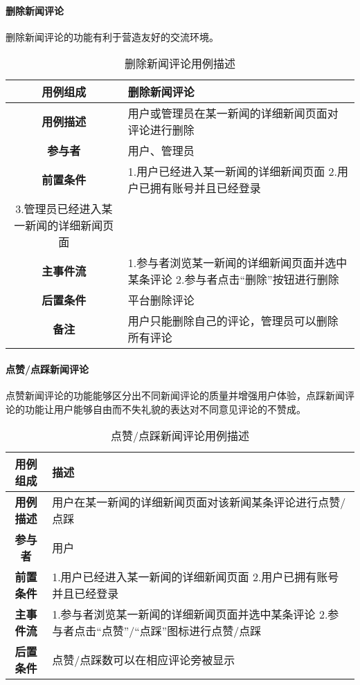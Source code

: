 \paragraph{删除新闻评论}

删除新闻评论的功能有利于营造友好的交流环境。\\

\begin{table}[H]
	\centering
	\caption{删除新闻评论用例描述}
	\renewcommand\arraystretch{1.5}
	\begin{tabular}{|c|>{\raggedright\arraybackslash}p{10cm}|}
		\hline
		\textbf{用例组成} & \textbf{删除新闻评论}\\
		\hline
		\textbf{用例描述} & 用户或管理员在某一新闻的详细新闻页面对评论进行删除\\
		\hline
		\textbf{参与者} & 用户、管理员\\
		\hline
		\textbf{前置条件} &
		1.用户已经进入某一新闻的详细新闻页面\newline
		2.用户已拥有账号并且已经登录\\
		3.管理员已经进入某一新闻的详细新闻页面\\
		\hline
		\textbf{主事件流} &
		1.参与者浏览某一新闻的详细新闻页面并选中某条评论\newline
		2.参与者点击“删除”按钮进行删除\\
		\hline
		\textbf{后置条件} & 平台删除评论\\
		\hline
		\textbf{备注} & 用户只能删除自己的评论，管理员可以删除所有评论\\
		\hline
	\end{tabular}
\end{table}

\paragraph{点赞/点踩新闻评论}

点赞新闻评论的功能能够区分出不同新闻评论的质量并增强用户体验，点踩新闻评论的功能让用户能够自由而不失礼貌的表达对不同意见评论的不赞成。\\

\begin{table}[H]
	\centering
	\caption{点赞/点踩新闻评论用例描述}
	\renewcommand\arraystretch{1.5}
	\begin{tabular}{|c|>{\raggedright\arraybackslash}p{10cm}|}
		\hline
		\textbf{用例组成} & \textbf{描述}\\
		\hline
		\textbf{用例描述} & 用户在某一新闻的详细新闻页面对该新闻某条评论进行点赞/点踩\\ 
		\hline
		\textbf{参与者} & 用户\\
		\hline
		\textbf{前置条件} & 
		1.用户已经进入某一新闻的详细新闻页面\newline
		2.用户已拥有账号并且已经登录\\
		\hline
		\textbf{主事件流} & 
		1.参与者浏览某一新闻的详细新闻页面并选中某条评论\newline
		2.参与者点击“点赞”/“点踩”图标进行点赞/点踩\\
		\hline
		\textbf{后置条件} & 点赞/点踩数可以在相应评论旁被显示\\
		\hline
	\end{tabular}
\end{table}

